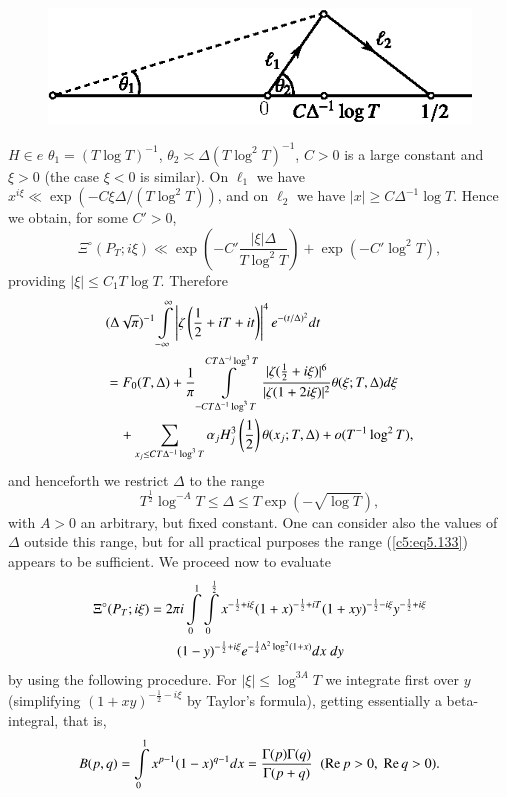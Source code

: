 \begin{figure}[H]
\centering
\includegraphics{figures/5.2.eps}
\end{figure}
$H \in e$ $\theta_1 = (T \log T)^{-1}$, $\theta_2 \asymp \Delta (T
\log^2 T)^{-1}$, $C >0$ is a large constant and $\xi > 0$ (the case
$\xi < 0$ is similar). On $\ell_1$ we have $x^{i\xi} \ll \exp (-C \xi
\Delta / (T \log^2 T))$, and on $\ell_2$ we have $|x| \geq C
\Delta^{-1} \log T$. Hence we obtain, for some $C' > 0$, 
\begin{equation}
\Xi^\circ (P_T ; i\xi) \ll \exp \left(-C' \frac{|\xi|\Delta}{T \log^2 T} \right) + \exp (-C'\log^2 T),\label{c5:eq5.131}
\end{equation}
providing $|\xi| \leq C_1 T \log T$. Therefore
\begin{align}
& (\Delta \sqrt{\pi})^{-1} \int\limits^\infty_{-\infty} \left|\zeta
  \left(\frac{1}{2} + iT + it \right)\right|^4 e^{-(t/\Delta)^2}
  dt\label{c5:eq5.132}\\ 
& = F_0 (T,\Delta) + \frac{1}{\pi} \int\limits^{CT\Delta^{-i} \log^3
  T}_{-CT \Delta^{-1} \log^3 T} \frac{|\zeta (\frac{1}{2} + i
  \xi)|^6}{|\zeta(1+2i\xi)|^2} \theta (\xi; T,\Delta) d \xi\notag\\ 
&\quad + \sum\limits_{x_j \leq C T \Delta^{-1} \log^3 T} \alpha_j
H^3_j \left(\frac{1}{2} \right) \theta (x_j ; T,\Delta) + o (T^{-1}
\log^2 T),\notag 
\end{align}
and henceforth we restrict $\Delta$ to the range
\begin{equation}
T^{\frac{1}{2}} \log^{-A} T \leq \Delta \leq T \exp (-\sqrt{\log T}),
\label{c5:eq5.133} 
\end{equation}\pageoriginale
with $A>0$ an arbitrary, but fixed constant. One can consider also the
values of $\Delta$ outside this range, but for all practical purposes
the range (\ref{c5:eq5.133}) appears to be sufficient. We proceed now
to evaluate 
\begin{align}
\Xi^\circ (P_T; i \xi) &=
2 \pi i \int\limits^1_0 \int\limits^{\frac{1}{2}}_0 x^{-\frac{1}{2} +
  i \xi} (1+x)^{-\frac{1}{2} + iT} (1+xy)^{-\frac{1}{2} - i \xi}
y^{-\frac{1}{2} + i \xi}\notag\\ 
&\qquad (1-y)^{-\frac{1}{2}+i\xi} e^{-\frac{1}{4}
  \Delta^2 \log^2 (1+x) } dx \; dy \label{c5:eq5.134}
\end{align}
by using the following procedure. For $|\xi| \leq \log^{3A} T$ we
integrate first over $y$ (simplifying $(1+xy)^{-\frac{1}{2} -i \xi}$
by Taylor's formula), getting essentially a beta-integral, that is,  
{\fontsize{10pt}{12pt}\selectfont
\begin{equation}
B(p,q) = \int\limits^1_0 x^{p-1} (1-x)^{q-1} dx = \frac{\Gamma(p)
  \Gamma (q)}{\Gamma (p+q)} \;\; (\operatorname{Re} p > 0, \; \operatorname{Re} q >
0).\label{c5:eq5.135} 
\end{equation}}


